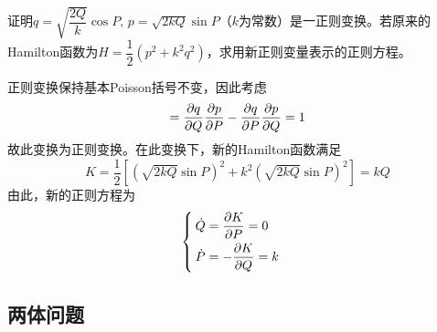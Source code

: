 \begin{question}[273页8.10]
证明$q = \sqrt{\dfrac{2Q}{k}}\cos P,\,p = \sqrt{2kQ}\sin P$（$k$为常数）是一正则变换。若原来的Hamilton函数为$H = \dfrac12 (p^2+k^2q^2)$，求用新正则变量表示的正则方程。
\end{question}
\begin{solution}
正则变换保持基本Poisson括号不变，因此考虑
\begin{equation*}
	[q,p] = \frac{\pl q}{\pl Q} \frac{\pl p}{\pl P} - \frac{\pl q}{\pl P} \frac{\pl p}{\pl Q} = 1
\end{equation*}
故此变换为正则变换。在此变换下，新的Hamilton函数满足
\begin{equation*}
	K = \frac12 \left[\left(\sqrt{2kQ}\sin P\right)^2 + k^2 \left(\sqrt{2kQ}\sin P\right)^2\right] = kQ
\end{equation*}
由此，新的正则方程为
\begin{equation*}
\begin{cases}
	\dot{Q} = \dfrac{\partial K}{\partial P} = 0 \\[1.5ex]
	\dot{P} = -\dfrac{\partial K}{\partial Q} = k
\end{cases}
\end{equation*}
\end{solution}

\subsection{两体问题}

